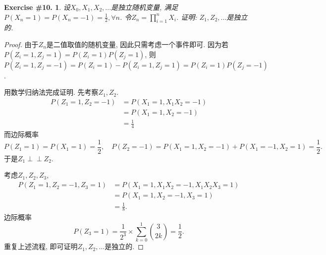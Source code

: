 \documentclass[UTF8, a4paper]{article}
\newcommand{\Perp}{\perp\!\!\!\!\perp}
\newtheorem{exercise}{Exercise \#10.}
\begin{document}
\begin{framed}
\begin{exercise}
设\(X_0, X_1, X_2, ...\)是独立随机变量, 满足\(P(X_n = 1) = P(X_n = -1) = \frac{1}{2}, \forall n\).
令\(Z_n = \prod_{i=1}^{n}X_i\).
证明: \(Z_1, Z_2, ...\)是独立的.
\end{exercise}
\end{framed}

\begin{proof}
由于\(Z_n\)是二值取值的随机变量, 因此只需考虑一个事件即可.
因为若\(P(Z_i = 1, Z_j = 1) = P(Z_i = 1)P(Z_j = 1)\), 则
\(P(Z_i = 1, Z_j = -1) = P(Z_i = 1) - P(Z_i = 1, Z_j = 1) = P(Z_i = 1)P(Z_j = -1)\).


用数学归纳法完成证明. 先考察\(Z_1, Z_2\).
$$
\begin{aligned}
    P(Z_1 = 1, Z_2 = -1) &= P(X_1 = 1, X_1 X_2 = -1) \\
    &= P(X_1 = 1, X_2 = -1) \\ 
    &= \frac{1}{4} 
\end{aligned}
$$
而边际概率
$$
P(Z_1 = 1) = P(X_1 = 1) = \frac{1}{2}, \quad P(Z_2 = -1) = P(X_1 = 1, X_2 = -1) + P(X_1 = -1, X_2 = 1) = \frac{1}{2}.
$$
于是\(Z_1 \Perp Z_2\).

考虑\(Z_1, Z_2, Z_3\), 
$$
\begin{aligned}
    P(Z_1 = 1, Z_2 = -1, Z_3 = 1) &= P(X_1 = 1, X_1X_2 = -1, X_1X_2X_3 = 1) \\
    &= P(X_1 = 1, X_2 = -1, X_3 = 1) \\
    &= \frac{1}{8}.
\end{aligned}
$$
边际概率
$$
P(Z_3 = 1) = \frac{1}{2^3} \times \sum_{k=0}^{1}\binom{3}{2k} = \frac{1}{2}.
$$
重复上述流程, 即可证明\(Z_1, Z_2, ...\)是独立的.
\end{proof}
\end{document}
